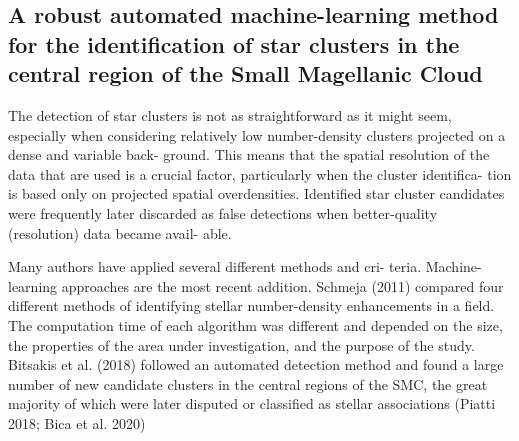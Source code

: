 \documentclass[../main.tex]{subfiles}
\begin{document}
\subsection{A robust automated machine-learning method for the identification
	of star clusters in the central region of the Small Magellanic Cloud}

The detection of star clusters is not as straightforward
as it might seem, especially when considering relatively low number-density clusters projected on a dense and variable back-
ground. This means that the spatial resolution of the data that are
used is a crucial factor, particularly when the cluster identifica-
tion is based only on projected spatial overdensities. Identified
star cluster candidates were frequently later discarded as false
detections when better-quality (resolution) data became avail-
able.

Many authors have applied several diﬀerent methods and cri-
teria. Machine-learning approaches are the most recent addition.
Schmeja (2011) compared four diﬀerent methods of identifying
stellar number-density enhancements in a field. The computation
time of each algorithm was diﬀerent and depended on the size,
the properties of the area under investigation, and the purpose of
the study. Bitsakis et al. (2018) followed an automated detection
method and found a large number of new candidate clusters in
the central regions of the SMC, the great majority of which were
later disputed or classified as stellar associations (Piatti 2018;
Bica et al. 2020)
\end{document}
